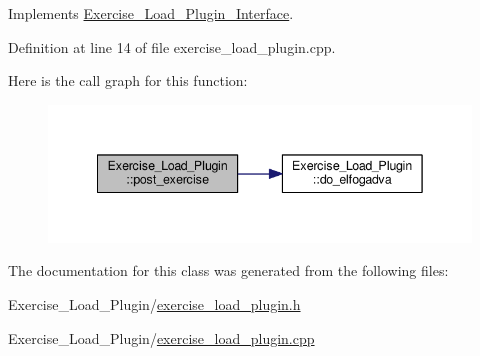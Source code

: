Implements \hyperlink{classExercise__Load__Plugin__Interface_abb9fef00080e48c6ce458b7476db97d9}{Exercise\+\_\+\+Load\+\_\+\+Plugin\+\_\+\+Interface}.



Definition at line 14 of file exercise\+\_\+load\+\_\+plugin.\+cpp.

Here is the call graph for this function\+:\nopagebreak
\begin{figure}[H]
\begin{center}
\leavevmode
\includegraphics[width=342pt]{classExercise__Load__Plugin_ad0c7c810dd492a014e17d40cdfe3d35d_cgraph}
\end{center}
\end{figure}


The documentation for this class was generated from the following files\+:\begin{DoxyCompactItemize}
\item 
Exercise\+\_\+\+Load\+\_\+\+Plugin/\hyperlink{exercise__load__plugin_8h}{exercise\+\_\+load\+\_\+plugin.\+h}\item 
Exercise\+\_\+\+Load\+\_\+\+Plugin/\hyperlink{exercise__load__plugin_8cpp}{exercise\+\_\+load\+\_\+plugin.\+cpp}\end{DoxyCompactItemize}
